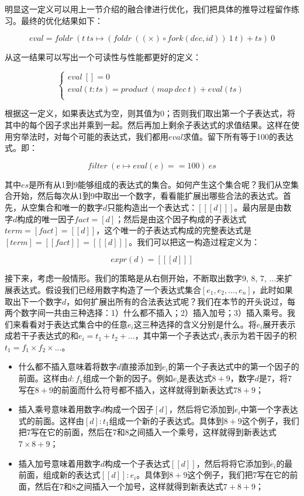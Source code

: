 \documentclass{article}
\begin{document}
明显这一定义可以用上一节介绍的融合律进行优化，我们把具体的推导过程留作练习。最终的优化结果如下：

\[
eval = foldr\ (t\ ts \mapsto (foldr\ ((\times) \circ fork(dec, id))\ 1\ t) + ts)\ 0
\]

从这一结果可以写出一个可读性与性能都更好的定义：

\[
\begin{cases}
eval\ [] = 0 \\
eval (t:ts) = product\ (map\ dec\ t) + eval(ts) \\
\end{cases}
\]

根据这一定义，如果表达式为空，则其值为0；否则我们取出第一个子表达式，将其中的每个因子求出并乘到一起。然后再加上剩余子表达式的求值结果。这样在使用穷举法时，对每个可能的表达式，我们都用$eval$求值。留下所有等于100的表达式。即：

\[
filter\ (e \mapsto eval(e) == 100)\ es
\]

其中$es$是所有从1到9能够组成的表达式的集合。如何产生这个集合呢？我们从空集合开始，然后每次从1到9中取出一个数字，看看能扩展出哪些合法的表达式。首先，从空集合和唯一的数字$d$只能构造出一个表达式：$[[[d]]]$。最内层是由数字$d$构成的唯一因子$fact = [d]$；然后是由这个因子构成的子表达式$term = [fact] = [[d]]$，这个唯一的子表达式构成的完整表达式是$[term] = [[fact]] = [[[d]]]$。我们可以把这一构造过程定义为：

\[
expr(d) = [[[d]]]
\]

接下来，考虑一般情形。我们的策略是从右侧开始，不断取出数字9, 8, 7, ...来扩展表达式。假设我们已经用数字构造了一个表达式集合$[e_1, e_2, ..., e_n]$，此时如果取出下一个数字$d$，如何扩展出所有的合法表达式呢？我们在本节的开头说过，每两个数字间一共由三种选择：1）什么都不插入；2）插入加号；3）插入乘号。我们来看看对于表达式集合中的任意$e_i$这三种选择的含义分别是什么。将$e_i$展开表示成若干子表达式的和$e_i = t_1 + t_2 + ...$，其中第一个子表达式$t_1$表示为若干因子的积$t_1 = f_1 \times f_2 \times ...$。

\begin{itemize}
\item 什么都不插入意味着将数字$d$直接添加到$e_i$的第一个子表达式中的第一个因子的前面。这样由$d:f_1$组成一个新的因子。例如$e_i$是表达式$8 + 9$，数字$d$是7，将7写在$8+9$的前面而什么符号都不插入，这样就得到新表达式$78 + 9$；
\item 插入乘号意味着用数字$d$构成一个因子$[d]$，然后将它添加到$e_i$中第一个字表达式的前面。这样由$[d]:t_1$组成一个新的子表达式。具体到$8 + 9$这个例子，我们把7写在它的前面，然后在7和8之间插入一个乘号，这样就得到新表达式$7 \times 8 + 9$；
\item 插入加号意味着用数字$d$构成一个子表达式$[[d]]$，然后将将它添加到$e_i$的最前面，组成新的表达式$[[d]]:e_i$。具体到$8 + 9$这个例子，我们把7写在它的前面，然后在7和8之间插入一个加号，这样就得到新表达式$7 + 8 + 9$；
\end{itemize}
\end{document}
